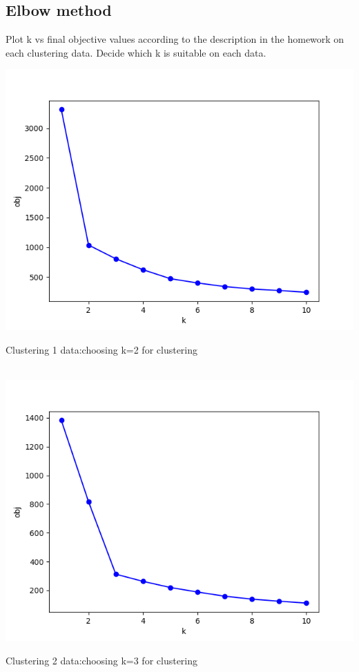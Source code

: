 \documentclass{article}
\begin{document}
\subsection{Elbow method}
Plot k vs final objective values according to the description in the homework on each clustering data. Decide which k is suitable on each data.

\includegraphics[width=\linewidth]{clustering_images/clustering1obj.png}
\centerline{Clustering 1 data:choosing k=2 for clustering}\\
\includegraphics[width=\linewidth]{clustering_images/clustering2obj.png}
\centerline{Clustering 2 data:choosing k=3 for clustering}\\
\end{document}
